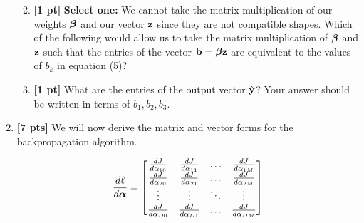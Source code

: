 \begin{enumerate}
\begin{enumerate}
        \begin{tcolorbox}[fit,height=2cm, width=14cm, blank, borderline={1pt}{-2pt}]
        \end{tcolorbox}

        
        \item \textbf{[1 pt]} \textbf{Select one:} We cannot take the matrix multiplication of our weights $\boldsymbol \beta$ and our vector $\mathbf{z}$ since they are not compatible shapes. Which of the following would allow us to take the matrix multiplication of $\boldsymbol \beta$ and $\mathbf{z}$ such that the entries of the vector $\mathbf{b} = \boldsymbol \beta\mathbf{z}$ are equivalent to the values of $b_k$ in equation (5)? 
        
        
        
        
        \item \textbf{[1 pt]} What are the entries of the output vector $\hat{\mathbf{y}}$? Your answer should be written in terms of $b_1,b_2,b_3$.
        
        \begin{tcolorbox}[fit,height=3.3cm, width=14cm, blank, borderline={1pt}{-2pt}]
        \end{tcolorbox}
        
        
    \end{enumerate} 

\item \textbf{[7 pts]} We will now derive the matrix and vector forms for the backpropagation algorithm.

$$\frac{d\ell}{d\boldsymbol \alpha} = 
    \begin{bmatrix}
        \frac{d J}{d \alpha_{10}} & \frac{d J}{d \alpha_{11}} & \dots  & \frac{d J}{d \alpha_{1M}} \\
        \frac{d J}{d \alpha_{20}} & \frac{d J}{d \alpha_{21}} & \dots  & \frac{d J}{d \alpha_{2M}} \\
        \vdots      & \vdots      & \ddots & \vdots \\
        \frac{d J}{d \alpha_{D0}} & \frac{d J}{d \alpha_{D1}} & \dots  & \frac{d J}{d \alpha_{DM}}
    \end{bmatrix}$$





\end{enumerate}
